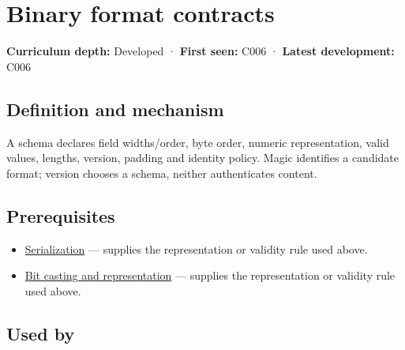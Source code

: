 \hypertarget{appendix-590bbb2424c1}{}\label{referencestart:appendix-590bbb2424c1}
\section{Binary format contracts}\label{appendix-590bbb2424c1-binary-format-contracts}

\hypertarget{appendix-590bbb2424c1-binary-format-contracts}{}

\textbf{Curriculum depth:} Developed · \textbf{First seen:} C006 · \textbf{Latest development:} C006

\begin{allmightroledefinition}

\subsection{Definition and mechanism}\label{appendix-590bbb2424c1-definition-and-mechanism}

\hypertarget{appendix-590bbb2424c1-definition-and-mechanism}{}

A schema declares field widths/order, byte order, numeric representation, valid values, lengths, version, padding and identity policy. Magic identifies a candidate format; version chooses a schema, neither authenticates content.

\end{allmightroledefinition}

\subsection{Prerequisites}\label{appendix-590bbb2424c1-prerequisites}

\hypertarget{appendix-590bbb2424c1-prerequisites}{}

\begin{itemize}
\tightlist
\item
  \hyperref[appendix-91d09ebed979]{Serialization} --- supplies the representation or validity rule used above.
\item
  \hyperref[appendix-34ee45f161c1]{Bit casting and representation} --- supplies the representation or validity rule used above.
\end{itemize}

\subsection{Used by}\label{appendix-590bbb2424c1-used-by}


